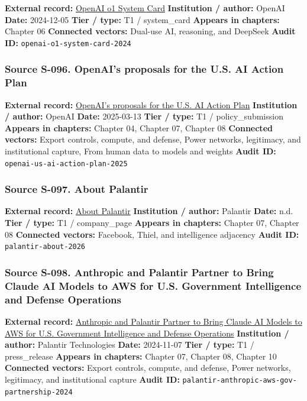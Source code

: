 \documentclass[
  american,
  11pt,
  letterpaper,
]{article}
\begin{document}
\textbf{External record:}
\href{https://openai.com/index/openai-o1-system-card/}{OpenAI o1 System
Card} \textbf{Institution / author:} OpenAI \textbf{Date:} 2024-12-05
\textbf{Tier / type:} T1 / system\_card \textbf{Appears in chapters:}
Chapter 06 \textbf{Connected vectors:} Dual-use AI, reasoning, and
DeepSeek \textbf{Audit ID:} \texttt{openai-o1-system-card-2024}

\subsubsection{Source S-096. OpenAI's proposals for the U.S. AI Action
Plan}\label{source-s-096-openais-proposals-for-the-us-ai-action-plan}

\textbf{External record:}
\href{https://openai.com/global-affairs/openai-proposals-for-the-us-ai-action-plan/}{OpenAI's
proposals for the U.S. AI Action Plan} \textbf{Institution / author:}
OpenAI \textbf{Date:} 2025-03-13 \textbf{Tier / type:} T1 /
policy\_submission \textbf{Appears in chapters:} Chapter 04, Chapter 07,
Chapter 08 \textbf{Connected vectors:} Export controls, compute, and
defense, Power networks, legitimacy, and institutional capture, From
human data to models and weights \textbf{Audit ID:}
\texttt{openai-us-ai-action-plan-2025}

\subsubsection{Source S-097. About
Palantir}\label{source-s-097-about-palantir}

\textbf{External record:} \href{https://www.palantir.com/about/}{About
Palantir} \textbf{Institution / author:} Palantir \textbf{Date:} n.d.
\textbf{Tier / type:} T1 / company\_page \textbf{Appears in chapters:}
Chapter 07, Chapter 08 \textbf{Connected vectors:} Facebook, Thiel, and
intelligence adjacency \textbf{Audit ID:} \texttt{palantir-about-2026}

\subsubsection{Source S-098. Anthropic and Palantir Partner to Bring
Claude AI Models to AWS for U.S. Government Intelligence and Defense
Operations}\label{source-s-098-anthropic-and-palantir-partner-to-bring-claude-ai-models-to-aws-for-u-s-government-intelligence-and-defense-operations}

\textbf{External record:}
\href{https://investors.palantir.com/news-details/2024/Anthropic-and-Palantir-Partner-to-Bring-Claude-AI-Models-to-AWS-for-U.S.-Government-Intelligence-and-Defense-Operations/}{Anthropic
and Palantir Partner to Bring Claude AI Models to AWS for U.S.
Government Intelligence and Defense Operations} \textbf{Institution /
author:} Palantir Technologies \textbf{Date:} 2024-11-07 \textbf{Tier /
type:} T1 / press\_release \textbf{Appears in chapters:} Chapter 07,
Chapter 08, Chapter 10 \textbf{Connected vectors:} Export controls,
compute, and defense, Power networks, legitimacy, and institutional
capture \textbf{Audit ID:}
\texttt{palantir-anthropic-aws-gov-partnership-2024}
\end{document}
